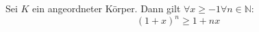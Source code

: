 Sei $K$ ein angeordneter Körper. Dann gilt $\forall x \geq -1 \forall n \in \mathbb{N} :$
$$(1+x)^n \geq 1+nx$$